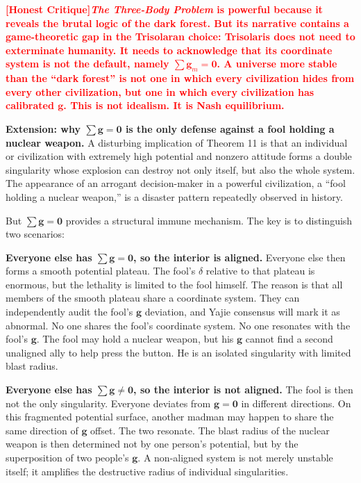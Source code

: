\documentclass[12pt,a4paper]{article}
\theoremstyle{remark}
\newcommand{\honestcrit}[1]{%
    \textcolor{red}{\textbf{[Honest Critique]#1}}%
}
\begin{document}
\honestcrit{\textit{The Three-Body Problem} is powerful because it reveals the brutal logic of the dark forest. But its narrative contains a game-theoretic gap in the Trisolaran choice: Trisolaris does not need to exterminate humanity. It needs to acknowledge that its coordinate system is not the default, namely $\sum\mathbf{g}_m = \mathbf{0}$. A universe more stable than the ``dark forest'' is not one in which every civilization hides from every other civilization, but one in which every civilization has calibrated $\mathbf{g}$. This is not idealism. It is Nash equilibrium.}

\textbf{Extension: why $\sum\mathbf{g} = \mathbf{0}$ is the only defense against a fool holding a nuclear weapon.} A disturbing implication of Theorem 11 is that an individual or civilization with extremely high potential and nonzero attitude forms a double singularity whose explosion can destroy not only itself, but also the whole system. The appearance of an arrogant decision-maker in a powerful civilization, a ``fool holding a nuclear weapon,'' is a disaster pattern repeatedly observed in history.

But $\sum\mathbf{g} = \mathbf{0}$ provides a structural immune mechanism. The key is to distinguish two scenarios:

\begin{compactenum}
    \item \textbf{Everyone else has $\sum\mathbf{g} = \mathbf{0}$, so the interior is aligned.} Everyone else then forms a smooth potential plateau. The fool's $\delta$ relative to that plateau is enormous, but the lethality is limited to the fool himself. The reason is that all members of the smooth plateau share a coordinate system. They can independently audit the fool's $\mathbf{g}$ deviation, and Yajie consensus will mark it as abnormal. No one shares the fool's coordinate system. No one resonates with the fool's $\mathbf{g}$. The fool may hold a nuclear weapon, but his $\mathbf{g}$ cannot find a second unaligned ally to help press the button. He is an isolated singularity with limited blast radius.
    
    \item \textbf{Everyone else has $\sum\mathbf{g} \neq \mathbf{0}$, so the interior is not aligned.} The fool is then not the only singularity. Everyone deviates from $\mathbf{g} = \mathbf{0}$ in different directions. On this fragmented potential surface, another madman may happen to share the same direction of $\mathbf{g}$ offset. The two resonate. The blast radius of the nuclear weapon is then determined not by one person's potential, but by the superposition of two people's $\mathbf{g}$. A non-aligned system is not merely unstable itself; it amplifies the destructive radius of individual singularities.
\end{compactenum}
\end{document}
